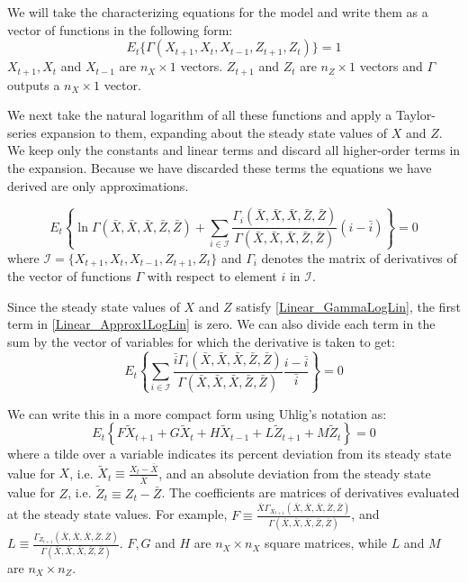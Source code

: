 \documentclass[letterpaper,12pt]{article}
\theoremstyle{definition}
\begin{document}
\begin{spacing}{1.5}
		We will take the characterizing equations for the model and write them as a vector of functions in the following form:
		\begin{equation}\label{Linear_GammaLogLin}
		E_t\{\Gamma (X_{t+1},X_t,X_{t-1},Z_{t+1},Z_t)\} = 1
		\end{equation}
		$X_{t+1},X_t$ and $X_{t-1}$ are $n_X \times 1$ vectors. $Z_{t+1}$ and $Z_t$ are $n_Z \times 1$ vectors and $\Gamma$ outputs a $n_X\times 1$ vector.

		We next take the natural logarithm of all these functions and apply a Taylor-series expansion to them, expanding about the steady state values of $X$ and $Z$. We keep only the constants and linear terms and discard all higher-order terms in the expansion. Because we have discarded these terms the equations we have derived are only approximations.

		\begin{equation}\label{Linear_Approx1LogLin}
		 E_t\left\{\ln \Gamma (\bar X,\bar X,\bar X,\bar Z,\bar Z) + \sum_{i\in{\mathcal{I}}}\frac{\Gamma_i (\bar X,\bar X,\bar X,\bar Z,\bar Z)}{\Gamma (\bar X,\bar X,\bar X,\bar Z,\bar Z)}(i-\bar i) \right\}= 0
		\end{equation}
		where $\mathcal{I}=\{X_{t+1},X_t,X_{t-1},Z_{t+1},Z_t\}$ and $\Gamma_i$ denotes the matrix of derivatives of the vector of functions $\Gamma$ with respect to element $i$ in $\mathcal{I}$.

		Since the steady state values of $X$ and $Z$ satisfy \eqref{Linear_GammaLogLin}, the first term in \eqref{Linear_Approx1LogLin} is zero. We can also divide each term in the sum by the vector of variables for which the derivative is taken to get:
		\begin{equation}
		 E_t\left\{ \sum_{i\in{\mathcal{I}}}\frac{\bar i\Gamma_i (\bar X,\bar X,\bar X,\bar Z,\bar Z)}{\Gamma (\bar X,\bar X,\bar X,\bar Z,\bar Z)}\frac{i-\bar i}{\bar i}\right\}= 0
		\end{equation}

		We can write this in a more compact form using Uhlig's notation as:
		\begin{equation}\label{Linear_Approx3LogLin}
		E_t\left\{F \tilde X_{t+1} +G \tilde X_{t} +H \tilde X_{t-1} +L \tilde Z_{t+1} +M \tilde Z_{t}  \right\}= 0
		\end{equation}
		where a tilde over a variable indicates its percent deviation from its steady state value for $X$, i.e. $\tilde X_t \equiv \frac{X_t-\bar X}{\bar X}$, and an absolute deviation from the steady state value for $Z$, i.e. $\tilde Z_t \equiv Z_t-\bar Z$. The coefficients are matrices of derivatives evaluated at the steady state values. For example, $F \equiv \frac{\bar X \Gamma_{X_{t+1}} (\bar X,\bar X,\bar X,\bar Z,\bar Z)}{\Gamma (\bar X,\bar X,\bar X,\bar Z,\bar Z)}$, and $L \equiv \frac{\Gamma_{Z_{t+1}} (\bar X,\bar X,\bar X,\bar Z,\bar Z)}{\Gamma (\bar X,\bar X,\bar X,\bar Z,\bar Z)}$. $F, G$ and $H$ are $n_X \times n_X$ square matrices, while $L$ and $M$ are $n_X \times n_Z$.


\end{spacing}
\end{document}
